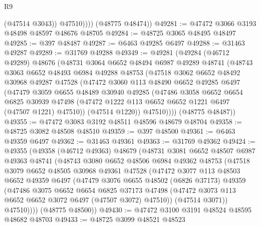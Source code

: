 \begin{lexlean}{R9}
\begin{coremodule}
                (@47514 @3043))
              @47510))))
      (@48775 @48474))
@49281 := @47472 @3066 @3193 @48498 @48597 @48676 @48705
@49284 := @48725 @3065 @48495 @48497
@49285 := @397 @48487
@49287 := @6463 @49285 @6497
@49288 := @31463 @49287
@49289 := @31769 @49288
@49349 := @49281
    (@49284
      (@46712 @49289)
      @48676
      (@48731
        @3064
        @6652
        @48494
        @6987
        @49289
        @48741
        (@48743
          @3063
          @6652
          @48493
          @6984
          @49288
          @48753
          (@47518
            @3062
            @6652
            @48492
            @30968
            @49287
            @47528
            (@47472
              @3060
              @113
              @48490
              @6652
              @49285
              @6497
              (@47479
                @3059
                @6655
                @48489
                @30940
                @49285
                (@47486
                  @3058
                  @6652
                  @6654
                  @6825
                  @30939
                  @47498
                  (@47472 @1222 @113 @6652 @6652 @1221 @6497 (@47507 @1221) @47510))
                (@47514 @1220))
              @47510))))
      (@48775 @48487))
@49355 := @47472 @3083 @3192 @48511 @48596 @48679 @48704
@49358 := @48725 @3082 @48508 @48510
@49359 := @397 @48500
@49361 := @6463 @49359 @6497
@49362 := @31463 @49361
@49363 := @31769 @49362
@49424 := @49355
    (@49358
      (@46712 @49363)
      @48679
      (@48731
        @3081
        @6652
        @48507
        @6987
        @49363
        @48741
        (@48743
          @3080
          @6652
          @48506
          @6984
          @49362
          @48753
          (@47518
            @3079
            @6652
            @48505
            @30968
            @49361
            @47528
            (@47472
              @3077
              @113
              @48503
              @6652
              @49359
              @6497
              (@47479
                @3076
                @6655
                @48502
                (@6826 @37173)
                @49359
                (@47486
                  @3075
                  @6652
                  @6654
                  @6825
                  @37173
                  @47498
                  (@47472 @3073 @113 @6652 @6652 @3072 @6497 (@47507 @3072) @47510))
                (@47514 @3071))
              @47510))))
      (@48775 @48500))
@49430 := @47472 @3100 @3191 @48524 @48595 @48682 @48703
@49433 := @48725 @3099 @48521 @48523

\end{coremodule}
\end{lexlean}
